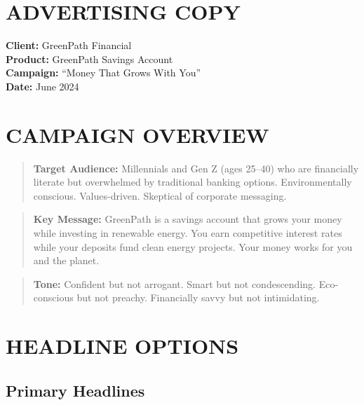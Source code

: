 \documentclass[
    language=english,
    doctype=advertising-copy,
    institution=none,
]{../../omnilatex}
\begin{document}
\maketitle

\section*{ADVERTISING COPY}

\textbf{Client:} GreenPath Financial\\
\textbf{Product:} GreenPath Savings Account\\
\textbf{Campaign:} ``Money That Grows With You''\\
\textbf{Date:} June 2024

\section*{CAMPAIGN OVERVIEW}

\begin{quote}
\textbf{Target Audience:} Millennials and Gen Z (ages 25--40) who are financially literate but overwhelmed by traditional banking options. Environmentally conscious. Values-driven. Skeptical of corporate messaging.
\end{quote}

\begin{quote}
\textbf{Key Message:} GreenPath is a savings account that grows your money while investing in renewable energy. You earn competitive interest rates while your deposits fund clean energy projects. Your money works for you and the planet.
\end{quote}

\begin{quote}
\textbf{Tone:} Confident but not arrogant. Smart but not condescending. Eco-conscious but not preachy. Financially savvy but not intimidating.
\end{quote}

\section*{HEADLINE OPTIONS}

\subsection*{Primary Headlines}
\end{document}
